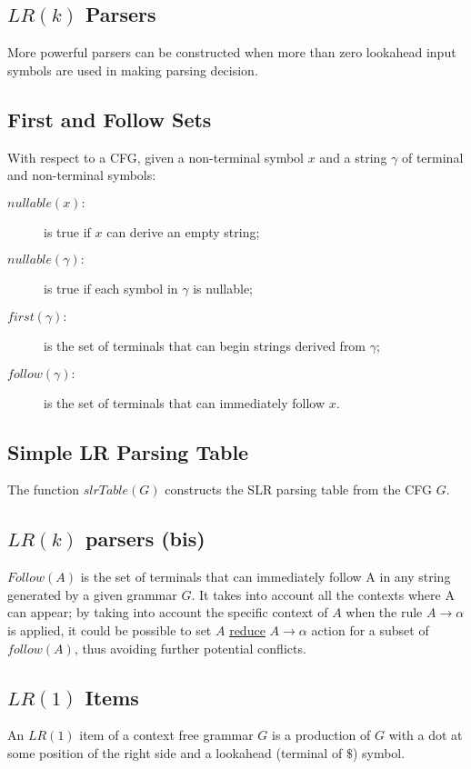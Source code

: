 \subsection{$LR(k)$ Parsers}
More powerful parsers can be constructed when more than zero lookahead input symbols are used in making parsing decision.

\subsection{First and Follow Sets}
With respect to a CFG, given a non-terminal symbol $x$ and a string $\gamma$ of terminal and non-terminal symbols:
\begin{description}
    \item[$nullable(x):$] is true if $x$ can derive an empty string;
    \item[$nullable(\gamma):$] is true if each symbol in $\gamma$ is nullable;
    \item[$first(\gamma):$] is the set of terminals that can begin strings derived from $\gamma$;
    \item[$follow(\gamma):$] is the set of terminals that can immediately follow $x$.
\end{description}

\subsection{Simple LR Parsing Table}
The function $slrTable(G)$ constructs the SLR parsing table from the CFG $G$.

\subsection{$LR(k)$ parsers (bis)}
$Follow(A)$ is the set of terminals that can immediately follow A in any string generated by a given grammar $G$.
It takes into account all the contexts where A can appear; by taking into account the specific context of $A$ when the rule $A \to \alpha$ is applied, it could be possible to set $A$ \underline{reduce} $A \to \alpha$ action for a subset of $follow(A)$, thus avoiding further potential conflicts.

\subsection{$LR(1)$ Items}
An $LR(1)$ item of a context free grammar $G$ is a production of $G$ with a dot at some position of the right side and a lookahead (terminal of $\$$) symbol.

